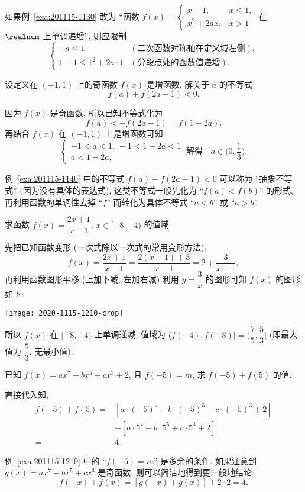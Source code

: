 如果例~\ref{exa:201115-1130} 改为 ``函数 $f(x)= \begin{cases}
    x-1, & x\leqslant 1,\\
    x^2+2ax, & x>1
\end{cases}$ 在 $\realnum$ 上单调递增'', 则应限制
\[\begin{cases}
    -a\leqslant 1 & (\text{二次函数对称轴在定义域左侧}),\\
    1-1\leqslant 1^2+ 2a\cdot1 & (\text{分段点处的函数值递增}).
    \end{cases}\]


\begin{example}\label{exa:201115-1140}
    设定义在 $(-1,1)$ 上的奇函数 $f(x)$ 是增函数, 解关于 $a$ 的不等式 
    \[f(a)+f(2a-1)<0.\]
\end{example}
\begin{solution}
    因为 $f(x)$ 是奇函数, 所以已知不等式化为
    \[f(a)<-f(2a-1)= f(1-2a).\]
    再结合 $f(x)$ 在 $(-1,1)$ 上是增函数可知
    \[\left\{\!\!\begin{array}{l}
        -1<a<1,\ -1<1-2a<1\\
        a<1-2a,
        \end{array}\right.\ \text{解得}\quad a\in\biggl(0,\frac13\biggr).\]
\end{solution}
\begin{remark}
    例~\ref{exa:201115-1140} 中的不等式 $f(a)+f(2a-1)<0$ 可以称为 ``抽象不等式'' (因为没有具体的表达式), 这类不等式一般先化为 ``$f(a)<f(b)$'' 的形式, 再利用函数的单调性去掉 ``$f$'' 而转化为具体不等式 ``$a<b$'' 或 ``$a>b$''.
\end{remark}


\begin{example}
    求函数 $f(x)=\dfrac{2x+1}{x-1}$, $x\in[-8,-4)$ 的值域.
\end{example}
\begin{solution}
    先把已知函数变形 (一次式除以一次式的常用变形方法),
    \[f(x)=\frac{2x+1}{x-1}= \frac{2(x-1)+3}{x-1}= 2+ \frac3{x-1},\]
    再利用函数图形平移 (上加下减, 左加右减) 利用 $y=\dfrac3x$ 的图形可知 $f(x)$ 的图形如下:
    \begin{center}
        \texttt{[image: 2020-1115-1210-crop]}
    \end{center}
    所以 $f(x)$ 在 $[-8,-4)$ 上单调递减, 值域为 $(f(-4),f(-8)]= \biggl(\dfrac75,\dfrac53\biggr]$ (即最大值为 $\dfrac53$, 无最小值).
\end{solution}

\begin{example}\label{exa:201115-1210}
    已知 $f(x)= ax^7-bx^5+cx^3+2$, 且 $f(-5)=m$, 求 $f(-5)+f(5)$ 的值.
\end{example}
\begin{solution}
    直接代入知,
    \begin{align*}
    f(-5)+f(5)
      ={}& [a\cdot (-5)^7- b\cdot (-5)^5+ c\cdot (-5)^3+2] \\
         & + [a\cdot 5^7- b\cdot 5^5+c\cdot 5^3+2]\\
      ={}& 4.\end{align*}
\end{solution}

例~\ref{exa:201115-1210} 中的 ``$f(-5)=m$'' 是多余的条件. 如果注意到 $g(x)=ax^7-bx^5+cx^3$ 是奇函数, 则可以简洁地得到更一般地结论:
\[f(-x)+f(x)= [g(-x)+g(x)]+2\cdot 2= 4.\]